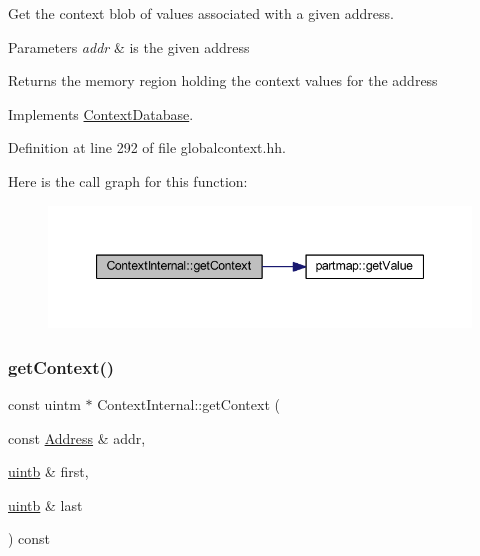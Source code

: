 Get the context blob of values associated with a given address. 


\begin{DoxyParams}{Parameters}
{\em addr} & is the given address \\
\hline
\end{DoxyParams}
\begin{DoxyReturn}{Returns}
the memory region holding the context values for the address 
\end{DoxyReturn}


Implements \mbox{\hyperlink{class_context_database_a780d39f9c8f7bafe9bbb7eb948d3f9ca}{Context\+Database}}.



Definition at line 292 of file globalcontext.\+hh.

Here is the call graph for this function\+:
\nopagebreak
\begin{figure}[H]
\begin{center}
\leavevmode
\includegraphics[width=347pt]{class_context_internal_a817dcba491a21368cfa81b522ff21b39_cgraph}
\end{center}
\end{figure}
\mbox{\label{class_context_internal_a8b1a3c3cee5fdfe657c114a8ce341e5c}} 
\subsubsection{\texorpdfstring{getContext()}{getContext()}\hspace{0.1cm}{\footnotesize\ttfamily [2/2]}}
{\footnotesize\ttfamily const uintm $\ast$ Context\+Internal\+::get\+Context (\begin{DoxyParamCaption}\item[{const \mbox{\hyperlink{class_address}{Address}} \&}]{addr,  }\item[{\mbox{\hyperlink{types_8h_a2db313c5d32a12b01d26ac9b3bca178f}{uintb}} \&}]{first,  }\item[{\mbox{\hyperlink{types_8h_a2db313c5d32a12b01d26ac9b3bca178f}{uintb}} \&}]{last }\end{DoxyParamCaption}) const\hspace{0.3cm}{\ttfamily [virtual]}}



